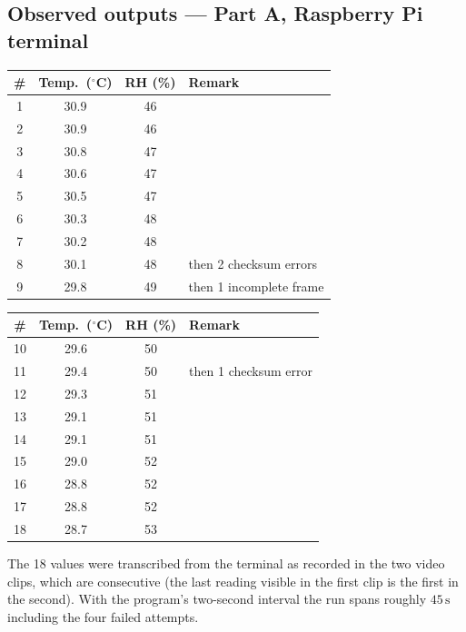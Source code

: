 \documentclass[10pt,a4paper]{article}
\begin{document}
\subsection*{Observed outputs --- Part A, Raspberry Pi terminal}

\vspace{2pt}
\noindent
\begin{minipage}[t]{0.48\textwidth}
\vspace{0pt}
\begin{tabularx}{\linewidth}{@{}c c c X@{}}
\toprule
\rowcolor{soft}
\textbf{\#} & \textbf{Temp.\ ($^{\circ}$C)} & \textbf{RH (\%)} & \textbf{Remark} \\
\midrule
1 & 30.9 & 46 & \\
2 & 30.9 & 46 & \\
3 & 30.8 & 47 & \\
4 & 30.6 & 47 & \\
5 & 30.5 & 47 & \\
6 & 30.3 & 48 & \\
7 & 30.2 & 48 & \\
8 & 30.1 & 48 & then 2 checksum errors \\
9 & 29.8 & 49 & then 1 incomplete frame \\
\bottomrule
\end{tabularx}
\end{minipage}\hfill
\begin{minipage}[t]{0.48\textwidth}
\vspace{0pt}
\begin{tabularx}{\linewidth}{@{}c c c X@{}}
\toprule
\rowcolor{soft}
\textbf{\#} & \textbf{Temp.\ ($^{\circ}$C)} & \textbf{RH (\%)} & \textbf{Remark} \\
\midrule
10 & 29.6 & 50 & \\
11 & 29.4 & 50 & then 1 checksum error \\
12 & 29.3 & 51 & \\
13 & 29.1 & 51 & \\
14 & 29.1 & 51 & \\
15 & 29.0 & 52 & \\
16 & 28.8 & 52 & \\
17 & 28.8 & 52 & \\
18 & 28.7 & 53 & \\
\bottomrule
\end{tabularx}
\end{minipage}

\vspace{8pt}
\noindent The 18 values were transcribed from the terminal as recorded in the two video
clips, which are consecutive (the last reading visible in the first clip is the first
in the second). With the program's two-second interval the run spans roughly
$45\,\mathrm{s}$ including the four failed attempts.
\end{document}
